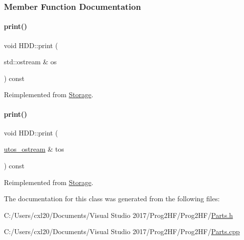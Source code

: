 \subsubsection{Member Function Documentation}
\mbox{\label{class_h_d_d_a07c34356018542934a4dd91ce38b0821}} 
\paragraph{\texorpdfstring{print()}{print()}\hspace{0.1cm}{\footnotesize\ttfamily [1/2]}}
{\footnotesize\ttfamily void H\+D\+D\+::print (\begin{DoxyParamCaption}\item[{std\+::ostream \&}]{os }\end{DoxyParamCaption}) const\hspace{0.3cm}{\ttfamily [virtual]}}



Reimplemented from \mbox{\hyperlink{class_storage_aa9f6ffb0fd45839b54bd4e254270445d}{Storage}}.

\mbox{\label{class_h_d_d_aca2c2583fa3304917905cd9185b64539}} 
\paragraph{\texorpdfstring{print()}{print()}\hspace{0.1cm}{\footnotesize\ttfamily [2/2]}}
{\footnotesize\ttfamily void H\+D\+D\+::print (\begin{DoxyParamCaption}\item[{\mbox{\hyperlink{structutos__ostream}{utos\+\_\+ostream}} \&}]{tos }\end{DoxyParamCaption}) const\hspace{0.3cm}{\ttfamily [virtual]}}



Reimplemented from \mbox{\hyperlink{class_storage_ab7ecf9e0777891b4e1a84bbf391a1cd4}{Storage}}.



The documentation for this class was generated from the following files\+:\begin{DoxyCompactItemize}
\item 
C\+:/\+Users/cxl20/\+Documents/\+Visual Studio 2017/\+Prog2\+H\+F/\+Prog2\+H\+F/\mbox{\hyperlink{_parts_8h}{Parts.\+h}}\item 
C\+:/\+Users/cxl20/\+Documents/\+Visual Studio 2017/\+Prog2\+H\+F/\+Prog2\+H\+F/\mbox{\hyperlink{_parts_8cpp}{Parts.\+cpp}}\end{DoxyCompactItemize}
